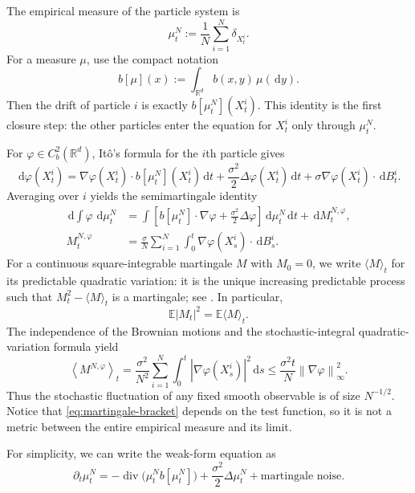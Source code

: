 \documentclass[11pt]{amsart}
\numberwithin{equation}{section}
\theoremstyle{plain}
\newcommand{\R}{\mathbb{R}}
\newcommand{\E}{\mathbb{E}}
\newcommand{\dd}{\,\mathrm{d}}
\newcommand{\abs}[1]{\left\lvert#1\right\rvert}
\newcommand{\norm}[1]{\left\lVert#1\right\rVert}
\DeclareMathOperator{\diver}{div}
\begin{document}
The empirical measure of the particle system is
\begin{equation}\label{eq:empirical-measure-time}
    \mu_t^N:=\frac1N\sum_{i=1}^N\delta_{X_t^i}.
\end{equation}
For a measure $\mu$, use the compact notation
\begin{equation}\label{eq:b-mu}
    b[\mu](x):=\int_{\R^d}b(x,y)\,\mu(\dd y).
\end{equation}
Then the drift of particle $i$ is exactly
$b[\mu_t^N](X_t^i)$.  This identity is the first closure step: the other
particles enter the equation for $X_t^i$ only through $\mu_t^N$.


For $\varphi\in C_b^2(\R^d)$, It\^o's formula for the $i$th particle gives
\[
 \dd\varphi(X_t^i)
 =\nabla\varphi(X_t^i)\cdot b[\mu_t^N](X_t^i)\dd t
 +\frac{\sigma^2}{2}\Delta\varphi(X_t^i)\dd t
 +\sigma\nabla\varphi(X_t^i)\cdot\dd B_t^i.
\]
Averaging over $i$ yields the semimartingale identity
\begin{align}
    \dd\int\varphi\,\dd\mu_t^N
    &=\int\left[b[\mu_t^N]\cdot\nabla\varphi
       +\frac{\sigma^2}{2}\Delta\varphi\right]\dd\mu_t^N\dd t
       +\dd M_t^{N,\varphi},\label{eq:empirical-weak}\\
    M_t^{N,\varphi}
    &=\frac{\sigma}{N}\sum_{i=1}^N
      \int_0^t\nabla\varphi(X_s^i)\cdot\dd B_s^i.
      \label{eq:empirical-martingale}
\end{align}
For a continuous square-integrable martingale $M$ with $M_0=0$, we write
$\langle M\rangle_t$ for its predictable quadratic variation: it is the unique increasing predictable process such that
$M_t^2-\langle M\rangle_t$ is a martingale; see \cite[Chapter~3]{KaratzasShreve1991}.  
In particular,
\[
 \E\abs{M_t}^2=\E\langle M\rangle_t.
\]
The independence of the Brownian motions and the stochastic-integral
quadratic-variation formula yield
\begin{equation}\label{eq:martingale-bracket}
  \left\langle M^{N,\varphi}\right\rangle_t
  =\frac{\sigma^2}{N^2}\sum_{i=1}^N
    \int_0^t\abs{\nabla\varphi(X_s^i)}^2\dd s
  \leq\frac{\sigma^2t}{N}\norm{\nabla\varphi}_\infty^2.
\end{equation}
Thus the stochastic fluctuation of any fixed smooth observable is of size
$N^{-1/2}$.  Notice that \eqref{eq:martingale-bracket} depends on the test function, so it is not a metric between the entire empirical measure and its limit.

For simplicity, we can write the weak-form equation as
\[
 \partial_t \mu_t^N = -\diver\bigl(\mu_t^N b[\mu_t^N]\bigr)  + \frac{\sigma^2}{2} \Delta \mu_t^N + \text{martingale noise}.
\]
\end{document}
